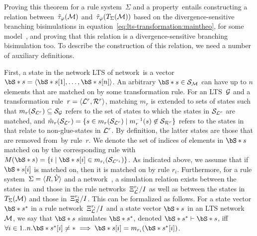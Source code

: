 Proving this theorem for a rule system~$\Sigma$ and a property~\Sf entails constructing a relation between~$\tilde\tau_\varphi(\mathcal{M})$ and~$\tilde\tau_\varphi(T_{\Sigma} (\mathcal{M}))$ based on the divergence-sensitive branching bisimulations in equation~\ref{eq:lts-transformation:maintheo}, for some model~\smodel, and proving that this relation is a divergence-sensitive branching bisimulation too.
To describe the construction of this relation, we need a number of auxiliary definitions.

First, a state in the network LTS of network~\smodel is a vector $\vectornot{s} = \langle \vectornot{s}[1],\ldots, \vectornot{s}[n] \rangle$.
An arbitrary $\vectornot{s} \in \states{\smodel}$ can have up to $n$ elements that are matched on by some transformation rule.
For an LTS~$\mathcal{G}$ and a transformation rule~$r = \langle \mathcal{L}^{r}, \mathcal{R}^{r} \rangle$,
matching $m_r$ is extended to sets of states such that $m_r({\mathcal{S}_{\mathcal{L}^r}}) \subseteq {\mathcal{S}_{\ensuremath{\mathcal{G}}}}$ refers to the set of states to which the states in ${\mathcal{S}_{\mathcal{L}^r}}$ are matched,
and $\hat m_r({\mathcal{S}_{\mathcal{L}^r}}) = \{ s \in m_r({\mathcal{S}_{\mathcal{L}^r}}) \mid m_r^{-1}(s) \not\in {\mathcal{S}_{\ensuremath{\mathcal{R}}^r}} \}$ refers to the states in~\states{\graph} that relate to non-glue-states in $\mathcal{L}^r$.
By definition, the latter states are those that are removed from~\graph by rule~$r$.
We denote the set of indices of elements in $\vectornot{s}$ matched on by the corresponding rule with $M(\vectornot{s}) = \{ i \mid \vectornot{s}[i] \in m_\ri(\states{\Llts^\ri}) \}$.
As indicated above, we assume that if $\vectornot{s}[i]$ is matched on, then it is matched on by rule $r_i$.
Furthermore, for a rule system~$\Sigma = \langle R,\hat{{\mathcal{V}}} \rangle$ and a network~\smodel, a simulation relation exists between the states in~\smodel and those in the rule networks~$\Xi_{\mathcal{L}}^{{r_i}}/I$ as well as between the states in~$T_{\Sigma} (\mathcal{M})$ and those in~$\Xi_{\mathcal{R}}^{{r_i}}/I$.
This can be formalized as follows.
For a state vector $\vectornot{s}^*$ in a rule network~$\Xi_{\mathcal{L}}^{{r_i}}/I$ and a state vector $\vectornot{s}$ in an LTS network~$\mathcal{M}$, we say that $\vectornot{s}$ simulates $\vectornot{s}^*$, denoted $\vectornot{s}^* \vdash \vectornot{s}$, iff $\forall i \in 1..n. \vectornot{s}^*[i] \neq \ast \implies \vectornot{s}[i] = m_\ri(\vectornot{s}^*[i])$.
